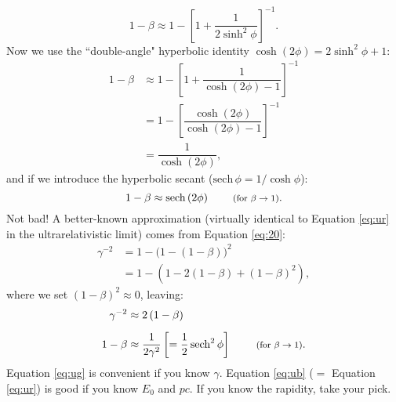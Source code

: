 \documentclass[12pt]{article}
\begin{document}
\begin{equation*}
1 - \beta \approx 1 - \left[ 1 + \dfrac{1}{2 \sinh^2{\phi}} \right]^{-1} .
\end{equation*}
Now we use the ``double-angle" hyperbolic identity $\cosh{(2 \phi)} = 2 \sinh^2{\phi} + 1$:
\begin{equation*}
\begin{split}
1 - \beta & \approx 1 - \left[ 1 + \dfrac{1}{\cosh{(2 \phi)} - 1} \right]^{-1} \\[5pt]
& = 1 - \left[ \dfrac{\cosh{(2 \phi)}}{\cosh{(2 \phi)} - 1} \right]^{-1} \\[7pt]
&= \dfrac{1}{\cosh{(2 \phi)}} ,
\end{split}
\end{equation*}
and if we introduce the hyperbolic secant ($\text{sech} \, \phi = 1 / \cosh{\phi}$):
\begin{equation}\label{eq:ur}
1 - \beta \approx \text{sech} \, (2 \phi) \qquad \textrm{\footnotesize{ (for $\beta \rightarrow 1$)}}.
\end{equation}
Not bad! A better-known approximation (virtually identical to Equation \ref{eq:ur} in the ultrarelativistic limit) comes from Equation \ref{eq:20}:
\begin{equation*}
\begin{split}
\gamma^{-2} &= 1 - \bigl( 1 - \left( 1 - \beta \right) \bigr)^2 \\
& = 1 - \left( 1 - 2 \left( 1 - \beta \right) + \left( 1 - \beta \right)^2 \right),
\end{split}
\end{equation*}
where we set $(1 - \beta)^2 \approx 0$, leaving:
\begin{equation}\label{eq:ug}
\begin{split}
\gamma^{-2} & \approx 2 \left( 1 - \beta \right) \\[5pt]
1 - \beta & \approx \dfrac{1}{2 \gamma^2} \left [= \dfrac{1}{2} \, \text{sech}^2 \, \phi \right] \qquad \textrm{\footnotesize{ (for $\beta \rightarrow 1$)}}.
\end{split}
\end{equation}
Equation \ref{eq:ug} is convenient if you know $\gamma$. Equation \ref{eq:ub} ($=$ Equation \ref{eq:ur}) is good if you know $E_0$ and $p c$. If you know the rapidity, take your pick.
\end{document}
